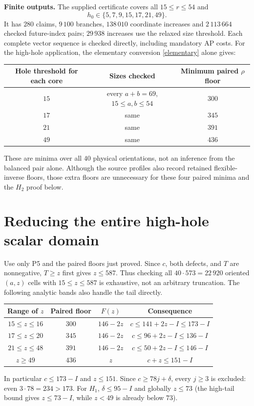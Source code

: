 \documentclass[11pt,a4paper]{article}
\begin{document}
\textbf{Finite outputs.} The supplied certificate covers all $15\le r\le54$ and
\[
h_0\in\{5,7,9,15,17,21,49\}.
\]
It has $280$ claims, $9\,100$ branches, $138\,010$ coordinate increases and $2\,113\,664$ checked future-index pairs; $29\,938$ increases use the relaxed size threshold. Each complete vector sequence is checked directly, including mandatory AP costs. For the high-hole application, the elementary conversion \eqref{elementary} alone gives:
\begin{center}
\begin{tabular}{ccc}
\toprule
Hole threshold for each core & Sizes checked & Minimum paired $\rho$ floor\\
\midrule
$15$ & every $a+b=69$, $15\le a,b\le54$ & $300$\\
$17$ & same & $345$\\
$21$ & same & $391$\\
$49$ & same & $436$\\
\bottomrule
\end{tabular}
\end{center}
These are minima over all $40$ physical orientations, not an inference from the balanced pair alone. Although the source profiles also record retained flexible-inverse floors, those extra floors are unnecessary for these four paired minima and the $H_2$ proof below.

\newpage
\section{Reducing the entire high-hole scalar domain}\label{scalar}
Use only P5 and the paired floors just proved. Since $c$, both defects, and $T$ are nonnegative, $T\ge z$ first gives $z\le587$. Thus checking all $40\cdot573=22\,920$ oriented $(a,z)$ cells with $15\le z\le587$ is exhaustive, not an arbitrary truncation. The following analytic bands also handle the tail directly.
\begin{center}
\begin{tabular}{cccc}
\toprule
Range of $z$ & Paired floor & $F(z)$ & Consequence\\
\midrule
$15\le z\le16$ & $300$ & $146-2z$ & $c\le141+2z-I\le173-I$\\
$17\le z\le20$ & $345$ & $146-2z$ & $c\le96+2z-I\le136-I$\\
$21\le z\le48$ & $391$ & $146-2z$ & $c\le50+2z-I\le146-I$\\
$z\ge49$ & $436$ & $z$ & $c+z\le151-I$\\
\bottomrule
\end{tabular}
\end{center}
In particular $c\le173-I$ and $z\le151$. Since $c\ge78j+\delta$, every $j\ge3$ is excluded: even $3\cdot78=234>173$. For $H_1$, $\delta\le95-I$ and globally $z\le73$ (the high-tail bound gives $z\le73-I$, while $z<49$ is already below $73$).
\end{document}
